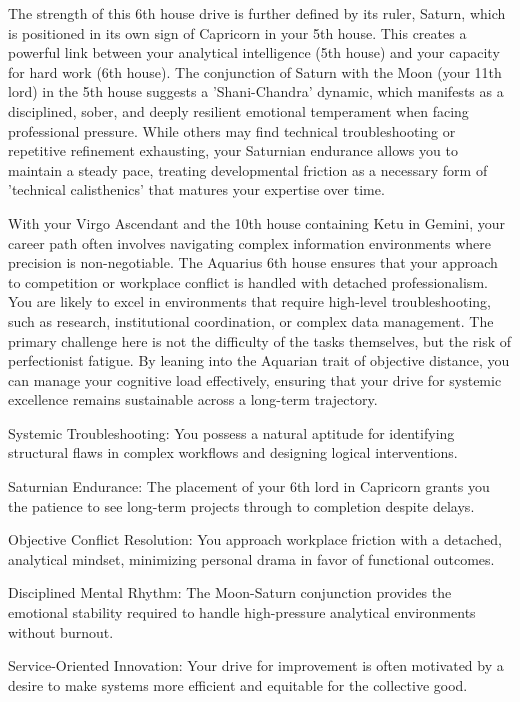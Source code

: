 {\fontsize{9}{13}\selectfont The strength of this 6th house drive is further defined by its ruler, Saturn, which is positioned in its own sign of Capricorn in your 5th house. This creates a powerful link between your analytical intelligence (5th house) and your capacity for hard work (6th house). The conjunction of Saturn with the Moon (your 11th lord) in the 5th house suggests a 'Shani-Chandra' dynamic, which manifests as a disciplined, sober, and deeply resilient emotional temperament when facing professional pressure. While others may find technical troubleshooting or repetitive refinement exhausting, your Saturnian endurance allows you to maintain a steady pace, treating developmental friction as a necessary form of 'technical calisthenics' that matures your expertise over time.}\par\vspace{1.8mm}

{\fontsize{9}{13}\selectfont With your Virgo Ascendant and the 10th house containing Ketu in Gemini, your career path often involves navigating complex information environments where precision is non-negotiable. The Aquarius 6th house ensures that your approach to competition or workplace conflict is handled with detached professionalism. You are likely to excel in environments that require high-level troubleshooting, such as research, institutional coordination, or complex data management. The primary challenge here is not the difficulty of the tasks themselves, but the risk of perfectionist fatigue. By leaning into the Aquarian trait of objective distance, you can manage your cognitive load effectively, ensuring that your drive for systemic excellence remains sustainable across a long-term trajectory.}\par\vspace{1.8mm}

\begin{diamondlist}
  \item {\fontsize{8.5}{12}\selectfont Systemic Troubleshooting: You possess a natural aptitude for identifying structural flaws in complex workflows and designing logical interventions.}
  \item {\fontsize{8.5}{12}\selectfont Saturnian Endurance: The placement of your 6th lord in Capricorn grants you the patience to see long-term projects through to completion despite delays.}
  \item {\fontsize{8.5}{12}\selectfont Objective Conflict Resolution: You approach workplace friction with a detached, analytical mindset, minimizing personal drama in favor of functional outcomes.}
  \item {\fontsize{8.5}{12}\selectfont Disciplined Mental Rhythm: The Moon-Saturn conjunction provides the emotional stability required to handle high-pressure analytical environments without burnout.}
  \item {\fontsize{8.5}{12}\selectfont Service-Oriented Innovation: Your drive for improvement is often motivated by a desire to make systems more efficient and equitable for the collective good.}
\end{diamondlist}

